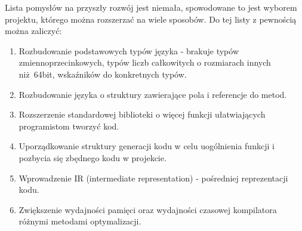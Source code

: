 Lista pomysłów na przyszły rozwój jest niemała, spowodowane to jest wyborem projektu, którego można rozszerzać na wiele sposobów. Do tej listy z pewnością można zaliczyć:

\begin{enumerate}
    \item Rozbudowanie podstawowych typów języka - brakuje typów zmiennoprzecinkowych, typów liczb całkowitych o rozmiarach innych niż 64bit, wskaźników do konkretnych typów.
    \item Rozbudowanie języka o struktury zawierające pola i referencje do metod.
    \item Rozszerzenie standardowej biblioteki o więcej funkcji ułatwiających programistom tworzyć kod.
    \item Uporządkowanie struktury generacji kodu w celu uogólnienia funkcji i pozbycia się zbędnego kodu w projekcie.
    \item Wprowadzenie IR (intermediate representation) - pośredniej reprezentacji kodu.
    \item Zwiększenie wydajności pamięci oraz wydajności czasowej kompilatora różnymi metodami optymalizacji.
\end{enumerate}
